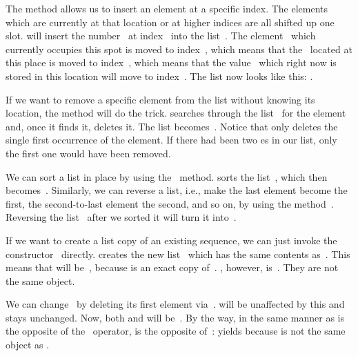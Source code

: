 The  method allows us to insert an element at a specific index.
The elements which are currently at that location or at higher indices are all shifted up one slot.
 will insert the number~ at index~ into the list~.
The element~ which currently occupies this spot is moved to index~, which means that the~ located at this place is moved to index~, which means that the value~ which right now is stored in this location will move to index~.
The list  now looks like this: \pythonil{[1, 7, 12, 56, 2, 4]}.

If we want to remove a specific element from the list without knowing its location, the  method will do the trick.
 searches through the list~ for the element~ and, once it finds it, deletes it.
The list becomes~\pythonil{[1, 7, 12, 2, 4]}.
Notice that  only deletes the single first occurrence of the element.
If there had been two es in our list, only the first one would have been removed.

We can sort a list in place by using the~ method.
 sorts the list~, which then becomes~\pythonil{[1, 2, 4, 7, 12]}.
Similarly, we can reverse a list, i.e., make the last element become the first, the second-to-last element the second, and so on, by using the method~.
Reversing the list~ after we sorted it will turn it into~\pythonil{[12, 7, 4, 2, 1]}.

If we want to create a list copy of an existing sequence, we can just invoke the constructor~ directly.
 creates the new list~ which has the same contents as~.
This means that  will be~, because  is an exact copy of~.
, however, is~.
They are not the same object.

We can change~ by deleting its first element via~.
 will be unaffected by this and stays unchanged.
Now, both \pythonIdx{==} and  will be~.
By the way, in the same manner as  is the opposite of the ~operator,  is the opposite of~:
 yields  because  is not the same object as .

